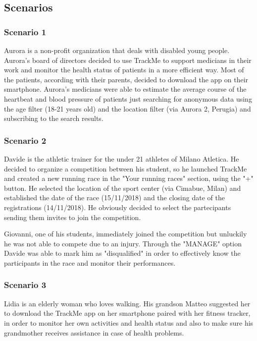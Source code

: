 \subsection{Scenarios}
\subsubsection{Scenario 1}
Aurora is a non-profit organization that deals with disabled young people. Aurora's board of directors decided to use TrackMe to support medicians in their work and monitor the health status of patients in a more efficient way. Most of the patients, according with their parents, decided to download the app on their smartphone. Aurora's medicians were able to estimate the average course of the heartbeat and blood pressure of patients just searching for anonymous data using the age filter (18-21 years old) and the location filter (via Aurora 2, Perugia) and subscribing to the search results.

\subsubsection{Scenario 2}
Davide is the athletic trainer for the under 21 athletes of Milano Atletica. He decided to organize a competition between his student, so he launched TrackMe and created a new running race in the "Your running races" section, using the "+" button. He selected the location of the sport center (via Cimabue, Milan) and established the date of the race (15/11/2018) and the closing date of the registrations (14/11/2018). He obviously decided to select the partecipants sending them invites to join the competition.

Giovanni, one of his students, immediately joined the competition but unluckily he was not able to compete due to an injury. Through the "MANAGE" option Davide was able to mark him as "disqualified" in order to effectively know the participants in the race and monitor their performances.

\subsubsection{Scenario 3}
Lidia is an elderly woman who loves walking. His grandson Matteo suggested her to download the TrackMe app on her smartphone paired with her fitness tracker, in order to monitor her own activities and health status and also to make sure his grandmother receives assistance in case of health problems.

